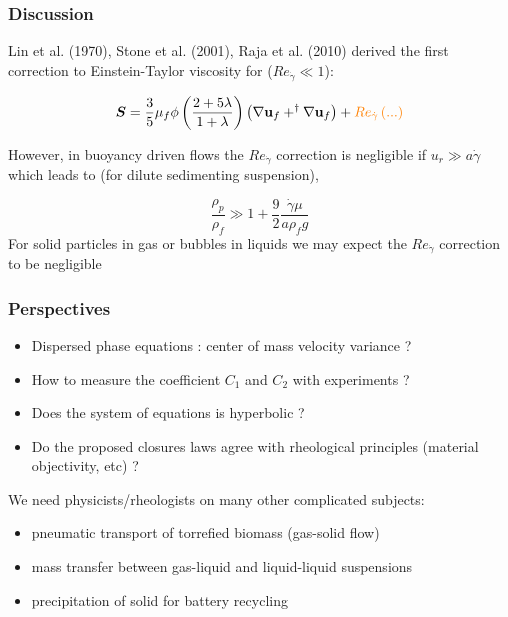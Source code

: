\documentclass{sintefbeamer}
\begin{document}
\section*{}






\begin{frame}
  \frametitle{Discussion}
 Lin et al. (1970), Stone et al. (2001), Raja et al. (2010) derived the first correction to Einstein-Taylor viscosity for ($Re_{\dot{\gamma}}\ll 1$):

 \begin{equation}
\bm S = \frac{3}{5}\mu_f \phi \left(\frac{2+5\lambda}{1+\lambda}\right) \left(\mathbf{\nabla} \textbf{u}_f + ^\dagger \mathbf{\nabla} \textbf{u}_f\right) + \color{orange}Re_{\dot{\gamma}}\left(...\right)
\end{equation}


 However, in buoyancy driven flows the $Re_{\dot{\gamma}}$ correction is  negligible if $u_r \gg a\dot{\gamma}$ which leads to (for dilute sedimenting suspension),

 \begin{equation}
  \frac{\rho _p}{\rho_f} \gg 1 + \frac{9}{2} \frac{\dot{\gamma}\mu}{a \rho _f g}
 \end{equation}
For solid particles in gas or bubbles in liquids we may expect the $Re_{\dot\gamma}$ correction to be negligible
 
\end{frame}

\begin{frame}
  \frametitle{Perspectives}
  \begin{itemize}
    \item Dispersed phase equations : center of mass velocity variance ?
    \item How to measure the coefficient $C_1$ and $C_2$ with experiments  ?
    \item Does the system of equations is hyperbolic ? %
    \item Do the proposed closures laws agree with rheological principles (material objectivity, etc) ?
  \end{itemize}


 We need physicists/rheologists on many other complicated subjects:
\begin{itemize}
  \item pneumatic transport of torrefied biomass (gas-solid flow)
  \item mass transfer between gas-liquid and liquid-liquid suspensions
  \item precipitation of solid for battery recycling
\end{itemize}
\centering
\end{frame}
\end{document}
